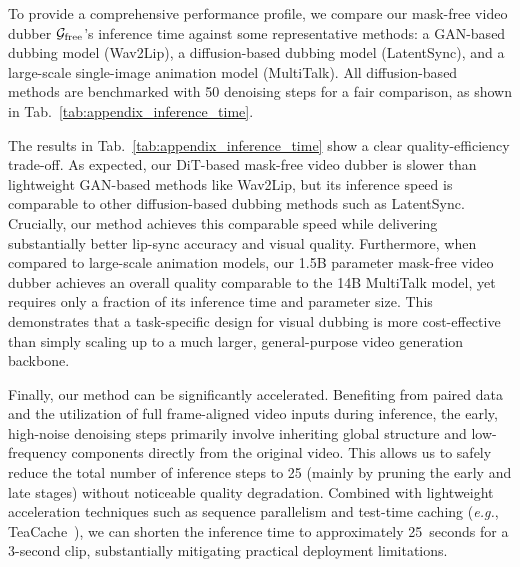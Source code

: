 To provide a comprehensive performance profile, we compare our mask-free video dubber $\mathcal{G}_{\text{free}}$'s inference time against some representative methods: a GAN-based dubbing model (Wav2Lip), a diffusion-based dubbing model (LatentSync), and a large-scale single-image animation model (MultiTalk). All diffusion-based methods are benchmarked with 50 denoising steps for a fair comparison, as shown in Tab.~\ref{tab:appendix_inference_time}.

\begin{table}[h]
\centering
\caption{Inference time comparison on a single A100 GPU. All diffusion models use 50 steps. The task is to process a 3-second, 25\,fps video.}
\label{tab:appendix_inference_time}
\end{table}

The results in Tab.~\ref{tab:appendix_inference_time} show a clear quality-efficiency trade-off. As expected, our DiT-based mask-free video dubber is slower than lightweight GAN-based methods like Wav2Lip, but its inference speed is comparable to other diffusion-based dubbing methods such as LatentSync. Crucially, our method achieves this comparable speed while delivering substantially better lip-sync accuracy and visual quality. Furthermore, when compared to large-scale animation models, our 1.5B parameter mask-free video dubber achieves an overall quality comparable to the 14B MultiTalk model, yet requires only a fraction of its inference time and parameter size. This demonstrates that a task-specific design for visual dubbing is more cost-effective than simply scaling up to a much larger, general-purpose video generation backbone.

Finally, our method can be significantly accelerated. Benefiting from paired data and the utilization of full frame-aligned video inputs during inference, the early, high-noise denoising steps primarily involve inheriting global structure and low-frequency components directly from the original video. This allows us to safely reduce the total number of inference steps to 25 (mainly by pruning the early and late stages) without noticeable quality degradation. Combined with lightweight acceleration techniques such as sequence parallelism and test-time caching (\textit{e.g.}, TeaCache~\cite{teacache}), we can shorten the inference time to approximately 25~seconds for a 3-second clip, substantially mitigating practical deployment limitations.


